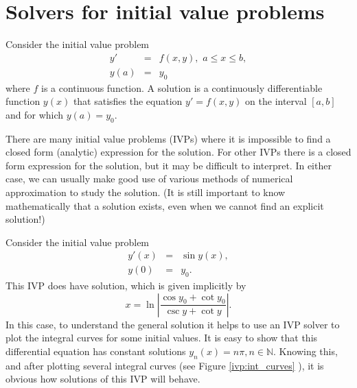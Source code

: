 \label{lab:IVP}


\section{Solvers for initial value problems}

Consider the initial value problem 
\begin{eqnarray*}
y' &=& f(x,y),\,\, a \leq x \leq b, \\
y(a) &=& y_0
\end{eqnarray*}
where $f$ is a continuous function. A solution is a continuously differentiable function $y(x)$ that satisfies the equation $y' = f(x,y)$ on the interval $[a,b]$ and for which $y(a) = y_0$.  


There are many initial value problems (IVPs) where it is impossible to find a closed form (analytic) expression for the solution. 
For other IVPs there is a closed form expression for the solution, but it may be difficult to interpret. 
In either case, we can usually make good use of various methods of numerical approximation to study the solution. (It is still important to know mathematically that a solution exists, even when we cannot find an explicit solution!)


Consider the initial value problem 
\begin{eqnarray*}
y'(x) &=& \sin y(x), \\
y(0) &=& y_0.
\end{eqnarray*}
This IVP does have solution, which is given implicitly by 
\[x = \ln \left|\frac{\cos y_0 + \cot y_0}{\csc y + \cot y} \right|.\]
In this case, to understand the general solution it helps to use an IVP solver to plot the integral curves for some initial values. It is easy to show that this differential equation has constant solutions $y_n(x) = n \pi, n \in \mathbb{N}$. Knowing this, and after plotting several integral curves (see Figure \ref{ivp:int_curves} ), it is obvious how solutions of this IVP will behave.

